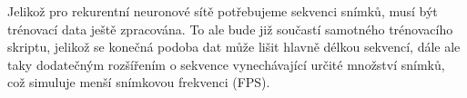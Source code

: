 Jelikož pro rekurentní neuronové sítě potřebujeme sekvenci snímků, musí být
trénovací data ještě zpracována. To ale bude již součastí samotného trénovacího
skriptu, jelikož se konečná podoba dat může lišit hlavně délkou sekvencí, dále
ale taky dodatečným rozšířením o sekvence vynechávající určité množství snímků,
což simuluje menší snímkovou frekvenci (FPS).

\endinput